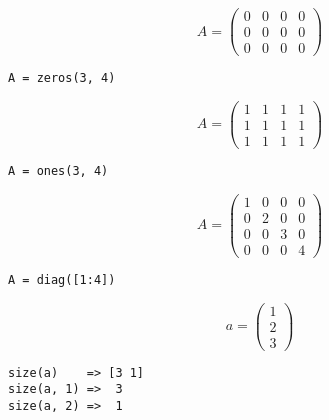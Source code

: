 \documentclass
[
  fontsize = 11pt,
  parskip  = half-,
  BCOR     = 0pt,
  DIV      = 11,
  ngerman
]
{scrartcl}
\begin{document}
\begin{minipage}{\mw}
  \begin{equation*}
    A=\begin{pmatrix}
        0 & 0 & 0 & 0 \\
        0 & 0 & 0 & 0 \\
        0 & 0 & 0 & 0
      \end{pmatrix}
  \end{equation*}
\end{minipage}%
\hfill
\begin{minipage}{\cw}
\begin{verbatim}
A = zeros(3, 4)
\end{verbatim}
\end{minipage}\bigskip

\begin{minipage}{\mw}
  \begin{equation*}
    A=\begin{pmatrix}
        1 & 1 & 1 & 1 \\
        1 & 1 & 1 & 1 \\
        1 & 1 & 1 & 1
      \end{pmatrix}
  \end{equation*}
\end{minipage}%
\hfill
\begin{minipage}{\cw}
\begin{verbatim}
A = ones(3, 4)
\end{verbatim}
\end{minipage}\bigskip

\begin{minipage}{\mw}
  \begin{equation*}
    A=\begin{pmatrix}
        1 & 0 & 0 & 0 \\
        0 & 2 & 0 & 0 \\
        0 & 0 & 3 & 0 \\
        0 & 0 & 0 & 4
      \end{pmatrix}
  \end{equation*}
\end{minipage}%
\hfill
\begin{minipage}{\cw}
\begin{verbatim}
A = diag([1:4])
\end{verbatim}
\end{minipage}\bigskip

\begin{minipage}{\mw}
  \begin{equation*}
    a=\begin{pmatrix}
        1 \\ 2 \\ 3
      \end{pmatrix}
  \end{equation*}
\end{minipage}%
\hfill
\begin{minipage}{\cw}
\begin{verbatim}
size(a)    => [3 1]
size(a, 1) =>  3
size(a, 2) =>  1
\end{verbatim}
\end{minipage}
\end{document}
